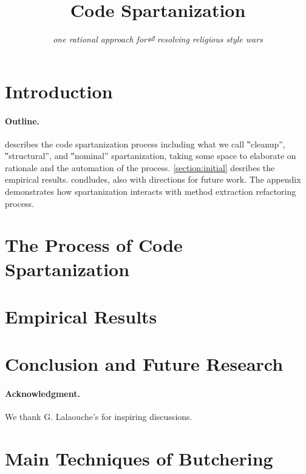 \documentclass[preprint,10pt,nonatbib]{sigplanconf}
\title{Code Spartanization}
\subtitle{\scriptsize \emph{one rational approach for⏎ resolving religious style wars}}
\begin{document}
\maketitle

\def\ignore#1{}
\def\gal{\marginpar[G$⇒$]{$⇐$G}}
\def\yossi{\marginpar[Y$⇒$]{$⇐$Y}}
\def\matteo{\marginpar[M$⇒$]{$⇐$M}}

\begin{abstract}
  
\end{abstract}

\section{Introduction}


\paragraph{Outline.}  describes the code spartanization
process including what we call ‟cleanup”, ‟structural”, and ‟nominal”
spartanization, taking some space to elaborate on rationale and the automation
of the process. \cref{section:initial} desribes the empirical results.
 condludes, also with directions for future work.  The
appendix demonstrates how spartanization interacts with method extraction
refactoring process. 

\section{The Process of Code Spartanization}
\label{section:process}


\section{Empirical Results}
\label{section:empirical}


\section{Conclusion and Future Research}
\label{section:zz}


\paragraph{Acknowledgment.} We thank G. Lalaouche's for inspiring discussions.

\balance
\small


\eject
\appendix
\section{Main Techniques of Butchering}
\label{section:techniques}


%
\end{document}
